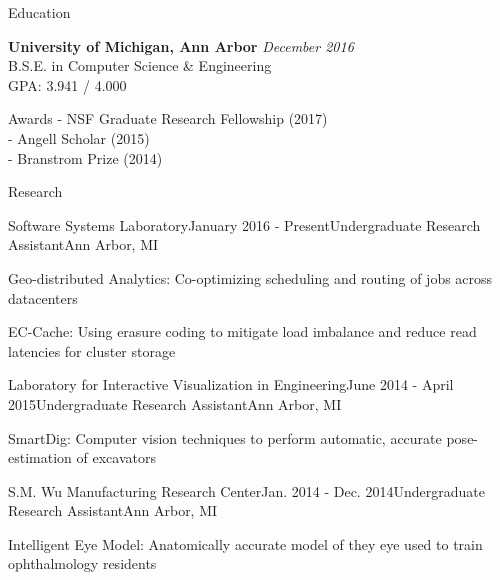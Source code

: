 \documentclass{resume} %
\begin{document}

\begin{rSection}{Education}

{\bf University of Michigan, Ann Arbor} \hfill {\em December 2016} \\ 
B.S.E. in Computer Science \& Engineering \\
GPA: 3.941 / 4.000

\end{rSection}

\begin{rSection}{Awards}
- NSF Graduate Research Fellowship (2017)\\
- Angell Scholar (2015)\\
- Branstrom Prize (2014)

\end{rSection}


\begin{rSection}{Research}

\begin{rSubsection}{Software Systems Laboratory}{January 2016 - Present}{Undergraduate Research Assistant}{Ann Arbor, MI}
\item Geo-distributed Analytics: Co-optimizing scheduling and routing of jobs across datacenters
\item EC-Cache: Using erasure coding to mitigate load imbalance and reduce read latencies for cluster storage
\end{rSubsection}

\begin{rSubsection}{Laboratory for Interactive Visualization in Engineering}{June 2014 - April 2015}{Undergraduate Research Assistant}{Ann Arbor, MI}
\item SmartDig: Computer vision techniques to perform automatic, accurate pose-estimation of excavators
\end{rSubsection}

\begin{rSubsection}{S.M. Wu Manufacturing Research Center}{Jan. 2014 - Dec. 2014}{Undergraduate Research Assistant}{Ann Arbor, MI}
\item Intelligent Eye Model: Anatomically accurate model of they eye used to train ophthalmology residents
\end{rSubsection}
\end{rSection}
\end{document}
